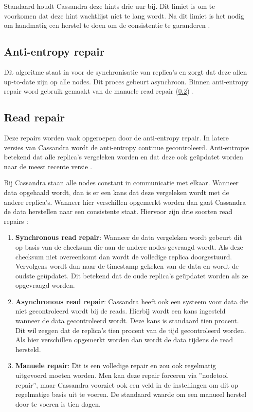 Standaard houdt Cassandra deze hints drie uur bij.
Dit limiet is om te voorkomen dat deze hint wachtlijst niet te lang wordt.
Na dit limiet is het nodig om handmatig een herstel te doen om de consistentie te garanderen \citep{strickland2014availability}.

\subsection{Anti-entropy repair}
Dit algoritme staat in voor de synchronisatie van replica's en zorgt dat deze allen up-to-date zijn op alle nodes.
Dit proces gebeurt asynchroon.
Binnen anti-entropy repair word gebruik gemaakt van de manuele read repair (\ref{sec:read_repair}) \citep{strickland2014availability}.

\subsection{Read repair}
\label{sec:read_repair}
Deze repairs worden vaak opgeroepen door de anti-entropy repair.
In latere versies van Cassandra wordt de anti-entropy continue gecontroleerd.
Anti-entropie betekend dat alle replica's vergeleken worden en dat deze ook geüpdatet worden naar de meest recente versie \citep{Kunz2013Entropy}.

Bij Cassandra staan alle nodes constant in communicatie met elkaar.
Wanneer data opgehaald wordt, dan is er een kans dat deze vergeleken wordt met de andere replica's.
Wanneer hier verschillen opgemerkt worden dan gaat Cassandra de data herstellen naar een consistente staat.
Hiervoor zijn drie soorten read repairs \citep{strickland2014availability}:

\begin{enumerate}
	\item \textbf{Synchronous read repair}:
	Wanneer de data vergeleken wordt gebeurt dit op basis van de checksum die aan de andere nodes gevraagd wordt.
	Als deze checksum niet overeenkomt dan wordt de volledige replica doorgestuurd.
	Vervolgens wordt dan naar de timestamp gekeken van de data en wordt de oudste geüpdatet.
	Dit betekend dat de oude replica's geüpdatet worden als ze opgevraagd worden.
	
	\item \textbf{Asynchronous read repair}:
	Cassandra heeft ook een systeem voor data die niet gecontroleerd wordt bij de reads.
	Hierbij wordt een kans ingesteld wanneer de data gecontroleerd wordt.
	Deze kans is standaard tien procent.
	Dit wil zeggen dat de replica's tien procent van de tijd gecontroleerd worden.
	Als hier verschillen opgemerkt worden dan wordt de data tijdens de read hersteld.
	
	\item \textbf{Manuele repair}:
	Dit is een volledige repair en zou ook regelmatig uitgevoerd moeten worden.
	Men kan deze repair forceren via ''nodetool repair'', maar Cassandra voorziet ook een veld in de instellingen om dit op regelmatige basis uit te voeren.
	De standaard waarde om een manueel herstel door te voeren is tien dagen.
\end{enumerate}

